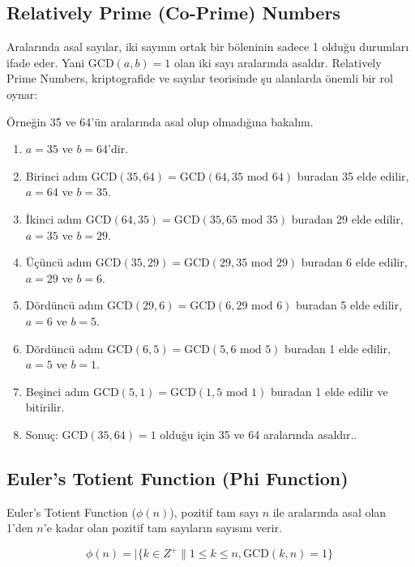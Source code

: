\newpage

\subsection{Relatively Prime (Co-Prime) Numbers}

Aralarında asal sayılar, iki sayının ortak bir böleninin sadece 1 olduğu durumları ifade eder. Yani $\text{GCD}(a, b) = 1$ olan iki sayı aralarında asaldır. Relatively Prime Numbers, kriptografide ve sayılar teorisinde şu alanlarda önemli bir rol oynar:

Örneğin 35 ve 64'ün aralarında asal olup olmadığına bakalım.

\begin{enumerate}
    \item $a = 35$ ve $b = 64$'dir.
    \item Birinci adım $\text{GCD}(35, 64) = \text{GCD}(64, 35 \text{ mod } 64)$ buradan 35 elde edilir, $a = 64$ ve $b = 35$.
    \item İkinci adım $\text{GCD}(64, 35) = \text{GCD}(35, 65 \text{ mod } 35)$ buradan 29 elde edilir, $a = 35$ ve $b = 29$.
    \item Üçüncü adım $\text{GCD}(35, 29) = \text{GCD}(29, 35 \text{ mod } 29)$ buradan 6 elde edilir, $a = 29$ ve $b = 6$.
    \item Dördüncü adım $\text{GCD}(29, 6) = \text{GCD}(6, 29 \text{ mod } 6)$ buradan 5 elde edilir, $a = 6$ ve $b = 5$.
    \item Dördüncü adım $\text{GCD}(6, 5) = \text{GCD}(5, 6 \text{ mod } 5)$ buradan 1 elde edilir, $a = 5$ ve $b = 1$.
    \item Beşinci adım $\text{GCD}(5, 1) = \text{GCD}(1, 5 \text{ mod } 1)$ buradan 1 elde edilir ve bitirilir.
    \item Sonuç: $\text{GCD}(35, 64) = 1$ olduğu için 35 ve 64 aralarında asaldır..
\end{enumerate}

\newpage

\subsection{Euler's Totient Function (Phi Function)}

Euler's Totient Function ($\phi(n)$), pozitif tam sayı $n$ ile aralarında asal olan 1'den $n$'e kadar olan pozitif tam sayıların sayısını verir. 

\[ \phi(n) = |\{ k \in Z^{+} \| 1 \leq k \leq n, \text{GCD}(k, n) = 1 \}\ \]

